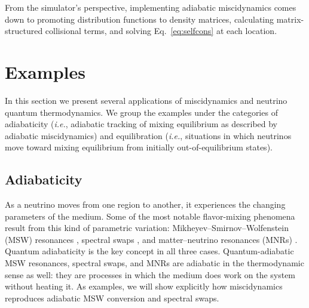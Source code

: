 \documentclass[aps,prd,twocolumn,groupedaddress,preprintnumbers]{revtex4-2}
\begin{document}
From the simulator's perspective, implementing adiabatic miscidynamics comes down to promoting distribution functions to density matrices, calculating matrix-structured collisional terms, and solving Eq.~\eqref{eq:selfcons} at each location.









\section{Examples}

In this section we present several applications of miscidynamics and neutrino quantum thermodynamics. We group the examples under the categories of adiabaticity (\textit{i.e.}, adiabatic tracking of mixing equilibrium as described by adiabatic miscidynamics) and equilibration (\textit{i.e.}, situations in which neutrinos move toward mixing equilibrium from initially out-of-equilibrium states).

\subsection{Adiabaticity}

As a neutrino moves from one region to another, it experiences the changing parameters of the medium. Some of the most notable flavor-mixing phenomena result from this kind of parametric variation: Mikheyev--Smirnov--Wolfenstein (MSW) resonances \cite{wolfenstein1978, mikheyev1985}, spectral swaps \cite{duan2006, duan2006b, raffelt2007, raffelt2007c, fogli2007, dasgupta2009, friedland2010, galais2011}, and matter--neutrino resonances (MNRs) \cite{malkus2012, malkus2014, malkus2016, wu2016, vaananen2016, zhu2016}. Quantum adiabaticity is the key concept in all three cases. Quantum-adiabatic MSW resonances, spectral swaps, and MNRs are adiabatic in the thermodynamic sense as well: they are processes in which the medium does work on the system without heating it. As examples, we will show explicitly how miscidynamics reproduces adiabatic MSW conversion and spectral swaps.
\end{document}
